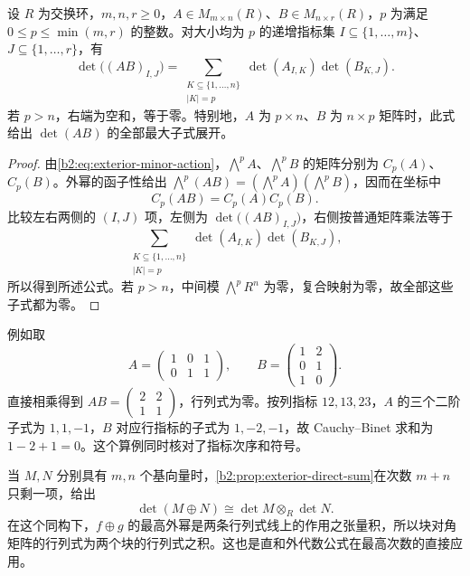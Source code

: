 \begin{theorem}\label{b2:thm:cauchy-binet}
	设 \(R\) 为交换环，\(m,n,r\ge0\)，\(A\in M_{m\times n}(R)\)、\(B\in M_{n\times r}(R)\)，\(p\) 为满足 \(0\le p\le\min(m,r)\) 的整数。对大小均为 \(p\) 的递增指标集 \(I\subseteq\{1,\ldots,m\}\)、\(J\subseteq\{1,\ldots,r\}\)，有
	\begin{equation}\label{b2:eq:cauchy-binet}
		\det\bigl((AB)_{I,J}\bigr) =\sum_{\substack{K\subseteq\{1,\ldots,n\}\\|K|=p}} \det(A_{I,K})\det(B_{K,J}).
	\end{equation}
	若 \(p>n\)，右端为空和，等于零。特别地，\(A\) 为 \(p\times n\)、\(B\) 为 \(n\times p\) 矩阵时，此式给出 \(\det(AB)\) 的全部最大子式展开。
\end{theorem}
\begin{proof}
	由\eqref{b2:eq:exterior-minor-action}，\(\bigwedge^pA\)、\(\bigwedge^pB\) 的矩阵分别为 \(C_p(A)\)、\(C_p(B)\)。外幂的函子性给出 \(\bigwedge^p(AB)=(\bigwedge^pA)(\bigwedge^pB)\)，因而在坐标中
	\[
		C_p(AB)=C_p(A)C_p(B).
	\]
	比较左右两侧的 \((I,J)\) 项，左侧为 \(\det\bigl((AB)_{I,J}\bigr)\)，右侧按普通矩阵乘法等于
	\[
		\sum_{\substack{K\subseteq\{1,\ldots,n\}\\|K|=p}} \det(A_{I,K})\det(B_{K,J}),
	\]
	所以得到所述公式。若 \(p>n\)，中间模 \(\bigwedge^p R^n\) 为零，复合映射为零，故全部这些子式都为零。
\end{proof}

例如取
\[
	A=\begin{pmatrix}1&0&1\\0&1&1\end{pmatrix},\qquad
	B=\begin{pmatrix}1&2\\0&1\\1&0\end{pmatrix}.
\]
直接相乘得到 \(AB=\begin{pmatrix}2&2\\1&1\end{pmatrix}\)，行列式为零。按列指标 \(12,13,23\)，\(A\) 的三个二阶子式为 \(1,1,-1\)，\(B\) 对应行指标的子式为 \(1,-2,-1\)，故 Cauchy–Binet 求和为 \(1-2+1=0\)。这个算例同时核对了指标次序和符号。

\ProseParagraphBreak
当 \(M,N\) 分别具有 \(m,n\) 个基向量时，\cref{b2:prop:exterior-direct-sum}在次数 \(m+n\) 只剩一项，给出
\[
	\det(M\oplus N)\cong\det M\otimes_R\det N.
\]
在这个同构下，\(f\oplus g\) 的最高外幂是两条行列式线上的作用之张量积，所以块对角矩阵的行列式为两个块的行列式之积。这也是直和外代数公式在最高次数的直接应用。
